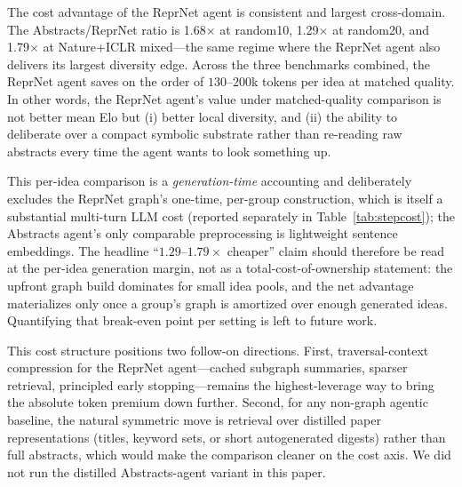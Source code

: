 \documentclass[10pt,twocolumn]{article}
\begin{document}
The cost advantage of the ReprNet agent is consistent and largest cross-domain.
The Abstracts/ReprNet ratio is 1.68$\times$ at random10, 1.29$\times$ at
random20, and 1.79$\times$ at Nature+ICLR mixed---the same regime where
the ReprNet agent also delivers its largest diversity edge.  Across the three
benchmarks combined, the ReprNet agent saves on the order of $130$--$200$k
tokens per idea at matched quality.  In other words, the ReprNet agent's value
under matched-quality comparison is not better mean Elo but
(i) better local diversity, and (ii) the ability to deliberate over a
compact symbolic substrate rather than re-reading raw abstracts every
time the agent wants to look something up.

This per-idea comparison is a \emph{generation-time} accounting and
deliberately excludes the ReprNet graph's one-time, per-group
construction, which is itself a substantial multi-turn LLM cost
(reported separately in Table~\ref{tab:stepcost}); the Abstracts
agent's only comparable preprocessing is lightweight sentence
embeddings.  The headline ``$1.29$--$1.79\times$ cheaper'' claim should
therefore be read at the per-idea generation margin, not as a
total-cost-of-ownership statement: the upfront graph build dominates
for small idea pools, and the net advantage materializes only once a
group's graph is amortized over enough generated ideas.  Quantifying
that break-even point per setting is left to future work.

This cost structure positions two follow-on directions.  First,
traversal-context compression for the ReprNet agent---cached subgraph
summaries, sparser retrieval, principled early stopping---remains the
highest-leverage way to bring the absolute token premium down further.
Second, for any non-graph agentic baseline, the natural symmetric move
is retrieval over distilled paper representations (titles, keyword
sets, or short autogenerated digests) rather than full abstracts,
which would make the comparison cleaner on the cost axis.  We did not
run the distilled Abstracts-agent variant in this paper.
\end{document}
